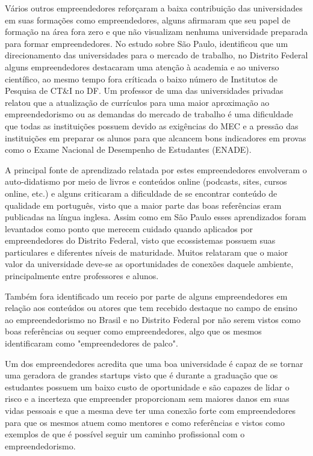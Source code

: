 Vários outros empreendedores reforçaram a baixa contribuição das universidades em suas formações como empreendedores, alguns afirmaram que seu papel de formação na área fora zero e que não visualizam nenhuma universidade preparada para formar empreendedores. No estudo sobre São Paulo,  identificou que um direcionamento das universidades para o mercado de trabalho, no Distrito Federal alguns empreendedores destacaram uma atenção à academia e ao universo científico, ao mesmo tempo fora críticada o baixo número de Institutos de Pesquisa de CT\&I no DF. Um professor de uma das universidades privadas relatou que a atualização de currículos para uma maior aproximação ao empreendedorismo ou as demandas do mercado de trabalho é uma dificuldade que todas as instituições possuem devido as exigências do MEC e a pressão das instituições em preparar os alunos para que alcancem bons indicadores em provas como o Exame Nacional de Desempenho de Estudantes (ENADE). 

A principal fonte de aprendizado relatada por estes empreendedores envolveram o auto-didatismo por meio de livros e conteúdos online (podcasts, sites, cursos online, etc.) e alguns criticaram a dificuldade de se encontrar conteúdo de qualidade em português, visto que a maior parte das boas referências eram publicadas na língua inglesa. Assim como em São Paulo esses aprendizados foram levantados como ponto que merecem cuidado quando aplicados por empreendedores do Distrito Federal, visto que ecossistemas possuem suas particulares e diferentes níveis de maturidade. Muitos relataram que o maior valor da universidade deve-se as oportunidades de conexões daquele ambiente, principalmente entre professores e alunos.

Também fora identificado um receio por parte de alguns empreendedores em relação aos conteúdos ou atores que tem recebido destaque no campo de ensino ao empreendedorismo no Brasil e no Distrito Federal por não serem vistos como boas referências ou sequer como empreendedores, algo que os mesmos identificaram como "empreendedores de palco".

Um dos empreendedores acredita que uma boa universidade é capaz de se tornar uma geradora de grandes startups visto que é durante a graduação que os estudantes possuem um baixo custo de oportunidade e são capazes de lidar o risco e a incerteza que empreender proporcionam sem maiores danos em suas vidas pessoais e que a mesma deve ter uma conexão forte com empreendedores para que os mesmos atuem como mentores e como referências e vistos como exemplos de que é possível seguir um caminho profissional com o empreendedorismo.

